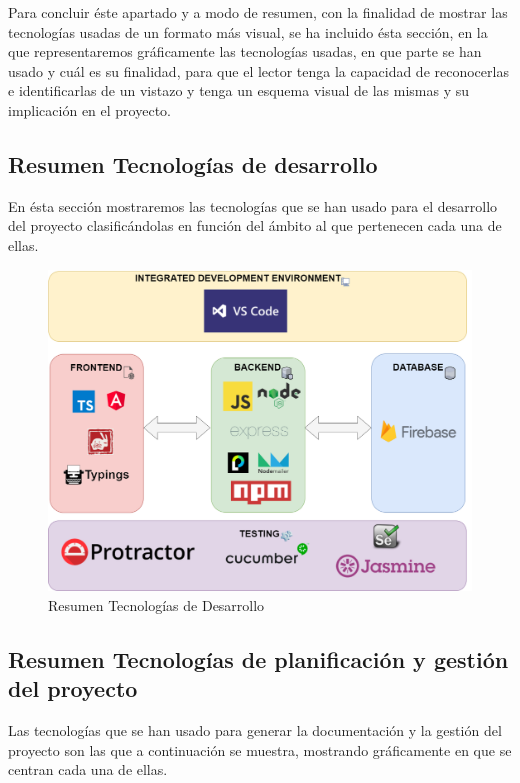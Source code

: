 \documentclass[11pt,openany]{book}
\begin{document}
Para concluir éste apartado y a modo de resumen, con la finalidad de mostrar las tecnologías usadas de un formato más visual, se ha incluido ésta sección, en la que representaremos gráficamente las tecnologías usadas, en que parte se han usado y cuál es su finalidad, para que el lector tenga la capacidad de reconocerlas e identificarlas de un vistazo y tenga un esquema visual de las mismas y su implicación en el proyecto.

\subsection{Resumen Tecnologías de desarrollo}

En ésta sección mostraremos las tecnologías que se han usado para el desarrollo del proyecto clasificándolas en función del ámbito al que pertenecen cada una de ellas.

\begin{figure}[H]
\centering
\includegraphics[totalheight=5cm]{resumenTecnologias/Resumen_Tecnolog_as_de_Desarrollo.png}
\caption{Resumen Tecnologías de Desarrollo}
\end{figure}
\vspace{-5mm}
\subsection{Resumen Tecnologías de planificación y gestión del proyecto}

Las tecnologías que se han usado para generar la documentación y la gestión del proyecto son las que a continuación se muestra, mostrando gráficamente en que se centran cada una de ellas.
\end{document}
